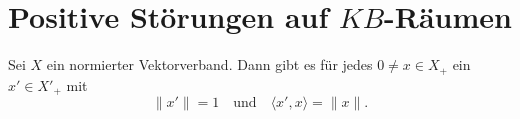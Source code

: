 




\section{Positive Störungen auf $KB$-Räumen}




\begin{lem} \label{Hahn-Banch Lemma}
Sei $X$ ein normierter Vektorverband. Dann gibt es für jedes $0\neq x\in X_+$  ein $x'\in X'_+$ mit
\begin{equation*}
\|x'\|= 1\quad\text{und}\quad\langle x', x\rangle = \|x\|.
\end{equation*}
\end{lem}

